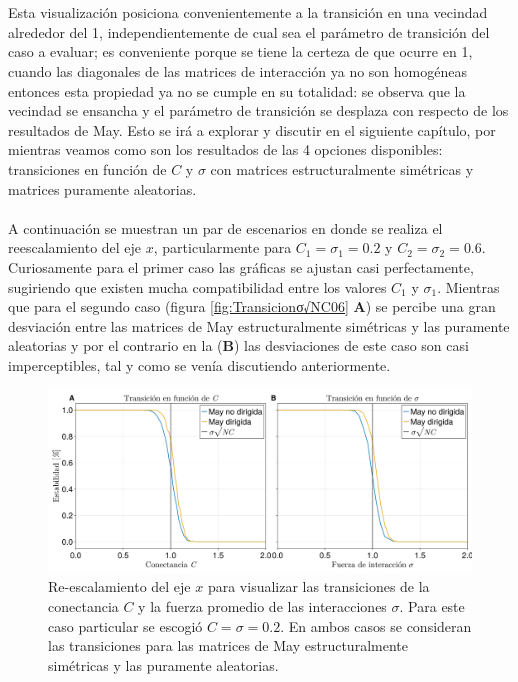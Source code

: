 \\
\\
Esta visualización posiciona convenientemente a la transición en una vecindad alrededor del 1, independientemente de cual sea el parámetro de transición del caso a evaluar; es conveniente porque se tiene la certeza de que ocurre en 1, cuando las diagonales de las matrices de interacción ya no son homogéneas entonces esta propiedad ya no se cumple en su totalidad: se observa que la vecindad se ensancha y el parámetro de transición se desplaza con respecto de los resultados de May. Esto se irá a explorar y discutir en el siguiente capítulo, por mientras veamos como son los resultados de las 4 opciones disponibles: transiciones en función de $C$ y $\sigma$ con matrices estructuralmente simétricas y matrices puramente aleatorias.
\\
\\
A continuación se muestran un par de escenarios en donde se realiza el reescalamiento del eje $x$, particularmente para $C_1=\sigma_1=0.2$ y $C_2=\sigma_2=0.6$. Curiosamente para el primer caso las gráficas se ajustan casi perfectamente, sugiriendo que existen mucha compatibilidad entre los valores $C_1$ y $\sigma_1$. Mientras que para el segundo caso (figura \ref{fig:Transicionσ√NC06} \textbf{A}) se percibe una gran desviación entre las matrices de May estructuralmente simétricas y las puramente aleatorias y por el contrario en la (\textbf{B}) las desviaciones de este caso son casi imperceptibles, tal y como se venía discutiendo anteriormente.
\begin{figure}[h!]
	\centering
	\includegraphics[scale=0.160]{../Imagenes/Transicionσ√NC02}
	\caption{Re-escalamiento del eje $x$ para visualizar las transiciones de la conectancia $C$ y la fuerza promedio de las interacciones $\sigma$. Para este caso particular se escogió $C=\sigma=0.2$. En ambos casos se consideran las transiciones para las matrices de May estructuralmente simétricas y las puramente aleatorias.}
	\label{fig:Transicionσ√NC02}
\end{figure}

